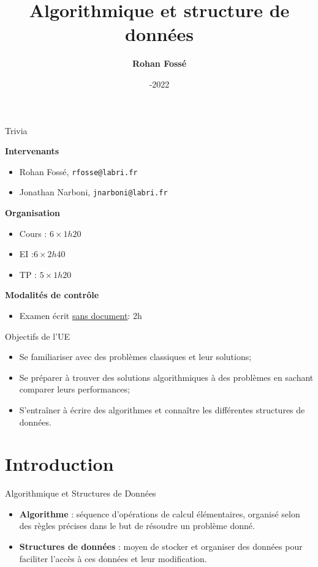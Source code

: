 \documentclass[10pt,xcolor=dvipsnames]{beamer}
\title{
Algorithmique et structure de données
}
\date{\centering 2021-2022}
\author{\centering \bf Rohan Fossé}
\begin{document}
\maketitle



  \begin{frame}{Trivia}

  \textbf{Intervenants}
  \begin{itemize}
 \item Rohan Fossé, \texttt{rfosse@labri.fr}
 \item Jonathan Narboni, \texttt{jnarboni@labri.fr}
  \end{itemize}
 \textbf{Organisation}
  \begin{itemize}
  \item Cours : $6 \times 1h20$
  \item EI :$6\times 2h40$ 
  \item TP : $5 \times 1h20$ 
  \end{itemize}
  \textbf{Modalités de contrôle}
  \begin{itemize}
      \item Examen écrit \underline{sans document}: 2h
  \end{itemize}
  
  \end{frame}
  
  \begin{frame}{Objectifs de l'UE}
      \begin{itemize}
          \item Se familiariser avec des problèmes classiques et leur solutions;
          \item Se préparer à trouver des solutions algorithmiques à des problèmes en sachant comparer leurs performances;
          \item S'entraîner à écrire des algorithmes et connaître les différentes structures de données.
      \end{itemize}
  \end{frame}

\section{Introduction}
\begin{frame}{Algorithmique et Structures de Données}
  \begin{itemize}
  \item \textbf{Algorithme}  : séquence d'opérations de calcul élémentaires, organisé selon des règles précises dans le but de résoudre un problème donné.
  \item \textbf{Structures de données} : moyen de stocker et organiser des données pour faciliter l'accès à ces données et leur modification.
  \end{itemize}
\end{frame}
\end{document}
